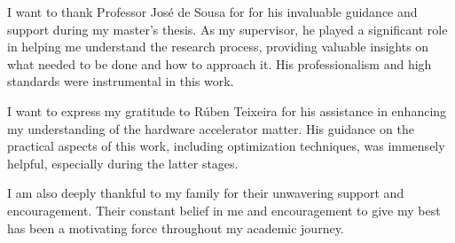 \hspace{0.4cm} I want to thank Professor José de Sousa for for his invaluable guidance and support during my master's thesis. As my supervisor, he played a significant role in helping me understand the research process, providing valuable insights on what needed to be done and how to approach it. His professionalism and high standards were instrumental in this work.

I want to express my gratitude to Rúben Teixeira for his assistance in enhancing my understanding of the hardware accelerator matter. His guidance on the practical aspects of this work, including optimization techniques, was immensely helpful, especially during the latter stages.

I am also deeply thankful to my family for their unwavering support and encouragement. Their constant belief in me and encouragement to give my best has been a motivating force throughout my academic journey.
